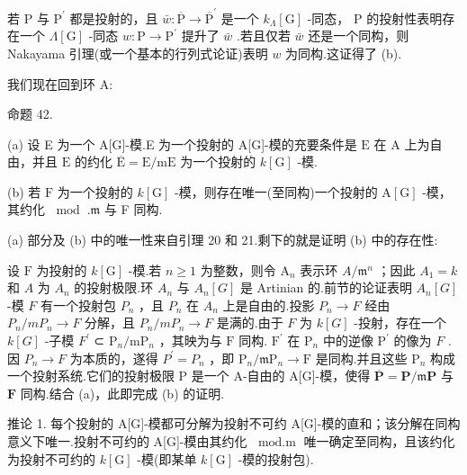\documentclass[10pt]{article}
\begin{document}
若 \(\mathrm{P}\) 与 \({\mathrm{P}}^{\prime }\) 都是投射的，且 \(\bar{w} : \overline{\mathrm{P}} \rightarrow  {\overline{\mathrm{P}}}^{\prime }\) 是一个 \({k}_{\Lambda }\left\lbrack  \mathrm{G}\right\rbrack\) -同态， \(\mathrm{P}\) 的投射性表明存在一个 \(\Lambda \left\lbrack  \mathrm{G}\right\rbrack\) -同态 \(w : \mathrm{P} \rightarrow  {\mathrm{P}}^{\prime }\) 提升了 \(\bar{w}\) .若且仅若 \(\bar{w}\) 还是一个同构，则 Nakayama 引理(或一个基本的行列式论证)表明 \(w\) 为同构.这证得了 (b).

我们现在回到环 A:

命题 42.

(a) 设 E 为一个 A[G]-模.E 为一个投射的 A[G]-模的充要条件是 \(\mathrm{E}\) 在 \(\mathrm{A}\) 上为自由，并且 \(\mathrm{E}\) 的约化 \(\overline{\mathrm{E}} = \mathrm{E}/\mathrm{{mE}}\) 为一个投射的 \(k\left\lbrack  \mathrm{G}\right\rbrack\) -模.

(b) 若 \(\mathrm{F}\) 为一个投射的 \(k\left\lbrack  \mathrm{G}\right\rbrack\) -模，则存在唯一(至同构)一个投射的 \(\mathrm{A}\left\lbrack  \mathrm{G}\right\rbrack\) -模，其约化 \({\;\operatorname{mod}\;.}\mathfrak{m}\) 与 F 同构.

(a) 部分及 (b) 中的唯一性来自引理 20 和 21.剩下的就是证明 (b) 中的存在性:

设 \(\mathrm{F}\) 为投射的 \(k\left\lbrack  \mathrm{G}\right\rbrack\) -模.若 \(n \geq  1\) 为整数，则令 \({\mathrm{A}}_{n}\) 表示环 \(A/{\mathfrak{m}}^{n}\) ；因此 \({A}_{1} = k\) 和 \(A\) 为 \({A}_{n}\) 的投射极限.环 \({A}_{n}\) 与 \({A}_{n}\left\lbrack  G\right\rbrack\) 是 Artinian 的.前节的论证表明 \({A}_{n}\left\lbrack  G\right\rbrack\) -模 \(F\) 有一个投射包 \({P}_{n}\) ，且 \({P}_{n}\) 在 \({A}_{n}\) 上是自由的.投影 \({P}_{n} \rightarrow  F\) 经由 \({P}_{n}/m{P}_{n} \rightarrow  F\) 分解，且 \({P}_{n}/m{P}_{n} \rightarrow  F\) 是满的.由于 \(F\) 为 \(k\left\lbrack  G\right\rbrack\) -投射，存在一个 \(k\left\lbrack  G\right\rbrack\) -子模 \({F}^{\prime }\) ⊂ \({\mathrm{P}}_{n}/\mathrm{m}{\mathrm{P}}_{n}\) ，其映为与 \(\mathrm{F}\) 同构. \({\mathrm{F}}^{\prime }\) 在 \({\mathrm{P}}_{n}\) 中的逆像 \({\mathrm{P}}^{\prime }\) 的像为 \(F\) .因 \({P}_{n} \rightarrow  F\) 为本质的，遂得 \({P}^{\prime } = {P}_{n}\) ，即 \({\mathrm{P}}_{n}/\mathfrak{m}{\mathrm{P}}_{n} \rightarrow  \mathrm{F}\) 是同构.并且这些 \({\mathrm{P}}_{n}\) 构成一个投射系统.它们的投射极限 \(\mathrm{P}\) 是一个 A-自由的 A[G]-模，使得 \(\overline{\mathbf{P}} = \mathbf{P}/\mathfrak{m}\mathbf{P}\) 与 \(\mathbf{F}\) 同构.结合 (a)，此即完成 (b) 的证明.

推论 1. 每个投射的 A[G]-模都可分解为投射不可约 A[G]-模的直和；该分解在同构意义下唯一.投射不可约的 A[G]-模由其约化 \({\;\operatorname{mod.m}}\) 唯一确定至同构，且该约化为投射不可约的 \(k\left\lbrack  \mathrm{G}\right\rbrack\) -模(即某单 \(k\left\lbrack  \mathrm{G}\right\rbrack\) -模的投射包).
\end{document}
